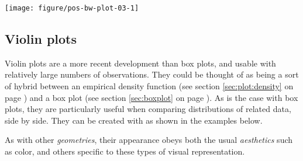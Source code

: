 \documentclass[krantz2]{krantz}\usepackage{knitr}
\begin{document}
\begin{knitrout}\footnotesize
{}\color{fgcolor}\begin{kframe}
\begin{alltt}
 \hlopt{+} 
\end{alltt}
\end{kframe}

{\centering \texttt{[image: figure/pos-bw-plot-03-1]} 

}


\end{knitrout}


\subsection{Violin plots}\label{sec:plot:violin}

Violin plots are a more recent development than box plots, and usable with relatively large numbers of observations. They could be thought of as being a sort of hybrid between an empirical density function (see section \ref{sec:plot:density} on page \pageref{sec:plot:density}) and a box plot (see section \ref{sec:boxplot} on page \pageref{sec:boxplot}). As is the case with box plots, they are particularly useful when comparing distributions of related data, side by side. They can be created with   as shown in the examples below.

\begin{knitrout}\footnotesize
{}\color{fgcolor}\begin{kframe}
\begin{alltt}
 \hlkwb{<-}  \hlopt{+}
  \hlstd{(}\hlstd{(}   \hlstd{=} \hlstd{)} \hlopt{+}
  \hlstd{(} \hlstd{=} \hlstd{,}  \hlstd{=} \hlstd{,}  \hlstd{=} \hlstd{,}  \hlstd{=} \hlstd{)}
\end{alltt}
\end{kframe}
\end{knitrout}

As with other \emph{geometries}, their appearance obeys both the usual \emph{aesthetics} such as color, and others specific to these types of visual representation.
\end{document}
